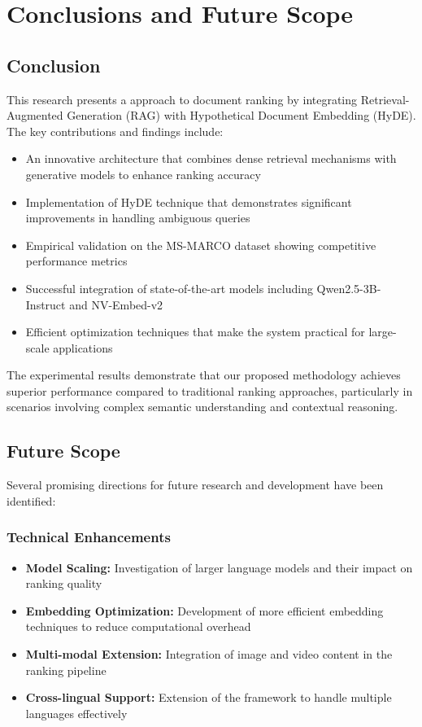 \chapter{Conclusions and Future Scope }
\label{C5} %
\clearpage

\section{Conclusion}
This research presents a approach to document ranking by integrating Retrieval-Augmented Generation (RAG)\cite{rag} with Hypothetical Document Embedding (HyDE)\cite{hyde}. The key contributions and findings include:

\begin{itemize}
    \item An innovative architecture that combines dense retrieval mechanisms with generative models to enhance ranking accuracy
    \item Implementation of HyDE technique that demonstrates significant improvements in handling ambiguous queries
    \item Empirical validation on the MS-MARCO\cite{ms-marco} dataset showing competitive performance metrics
    \item Successful integration of state-of-the-art models including Qwen2.5-3B-Instruct\cite{qwen2.5} and NV-Embed-v2\cite{nvembed}
    \item Efficient optimization techniques that make the system practical for large-scale applications
\end{itemize}

The experimental results demonstrate that our proposed methodology achieves superior performance compared to traditional ranking approaches, particularly in scenarios involving complex semantic understanding and contextual reasoning.

\section{Future Scope}
Several promising directions for future research and development have been identified:

\subsection{Technical Enhancements}
\begin{itemize}
    \item \textbf{Model Scaling:} Investigation of larger language models and their impact on ranking quality
    \item \textbf{Embedding Optimization:} Development of more efficient embedding techniques to reduce computational overhead
    \item \textbf{Multi-modal Extension:} Integration of image and video content in the ranking pipeline
    \item \textbf{Cross-lingual Support:} Extension of the framework to handle multiple languages effectively
\end{itemize}

